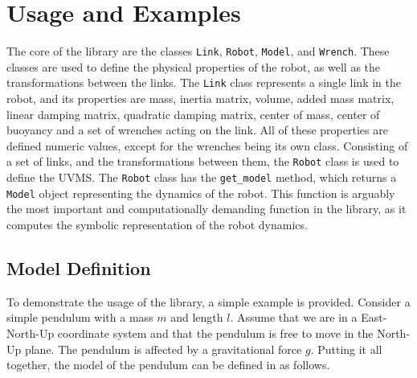 \section{Usage and Examples}

The core of the \pymuvs{} library are the classes \texttt{Link}, \texttt{Robot}, \texttt{Model},
and \texttt{Wrench}. These classes are used to define the physical properties of the
robot, as well as the transformations between the links. The \texttt{Link} class
represents a single link in the robot, and its properties are mass, inertia matrix,
volume, added mass matrix, linear damping matrix, quadratic damping matrix, center of
mass, center of buoyancy and a set of wrenches acting on the link. All of these
properties are defined numeric values, except for the wrenches being its own class.
Consisting of a set of links, and the transformations
between them, the \texttt{Robot} class is used to define the UVMS. The \texttt{Robot} class
has the \texttt{get\_model} method, which returns a \texttt{Model} object representing the
dynamics of the robot. This function is arguably the most important and computationally
demanding function in the library, as it computes the symbolic representation of the
robot dynamics.

\subsection{Model Definition}

To demonstrate the usage of the \pymuvs{} library, a simple example is provided.
Consider a simple pendulum with a mass $m$ and length $l$. Assume that we are in
a East-North-Up coordinate system and that the pendulum is free to move in the
North-Up plane. The pendulum is affected by a gravitational force $g$. Putting
it all together, the model of the pendulum can be defined in \pymuvs{} as follows.

